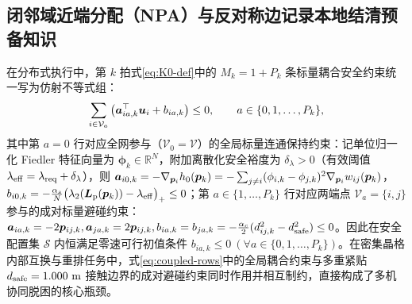 \subsection{闭邻域近端分配（NPA）与反对称边记录本地结清预备知识}\label{subsec:npa-prelim}
在分布式执行中，第 $k$ 拍式\eqref{eq:K0-def}中的 $M_k=1+P_k$ 条标量耦合安全约束统一写为仿射不等式组：
\begin{equation}
 \sum_{i\in\mathcal V_a}\big(\boldsymbol a_{ia,k}^{\top}\boldsymbol{u}_i+b_{ia,k}\big)\le 0,\qquad a\in\{0,1,\dots,P_k\},
 \label{eq:coupled-rows}
\end{equation}
其中第 $a=0$ 行对应全网参与（$\mathcal V_0=\mathcal V$）的全局标量连通保持约束：记单位归一化 Fiedler 特征向量为 $\boldsymbol\phi_k\in\mathbb R^N$，附加离散化安全裕度为 $\delta_\lambda>0$（有效阈值 $\lambda_{\mathrm{eff}}=\lambda_{\mathrm{req}}+\delta_\lambda$），则 $\boldsymbol a_{i0,k}=-\nabla_{\boldsymbol{p}_i}h_0(\boldsymbol{p}_k)=-\sum_{j\ne i}(\phi_{i,k}-\phi_{j,k})^2\nabla_{\boldsymbol{p}_i}w_{ij}(\boldsymbol{p}_k)$，$b_{i0,k}=-\frac{\alpha_s}{N}\big(\lambda_2(\boldsymbol{L}_{\mathrm{p}}(\boldsymbol{p}_k))-\lambda_{\mathrm{eff}}\big)_+\le 0$；第 $a\in\{1,\dots,P_k\}$ 行对应两端点 $\mathcal V_a=\{i,j\}$ 参与的成对标量避碰约束：$\boldsymbol a_{ia,k}=-2\boldsymbol{p}_{ij,k},\boldsymbol a_{ja,k}=2\boldsymbol{p}_{ij,k},b_{ia,k}=b_{ja,k}=-\frac{\alpha_c}{2}(d_{ij,k}^2-d_{\mathrm{safe}}^2)\le 0$。因此在安全配置集 $\mathcal S$ 内恒满足零速可行初值条件 $b_{ia,k}\le 0\ (\forall a\in\{0,1,\dots,P_k\})$。在密集晶格内部互换与重排任务中，式\eqref{eq:coupled-rows}中的全局耦合约束与多重紧贴 $d_{\mathrm{safe}}=1.000\ \mathrm m$ 接触边界的成对避碰约束同时作用并相互制约，直接构成了多机协同脱困的核心瓶颈。

